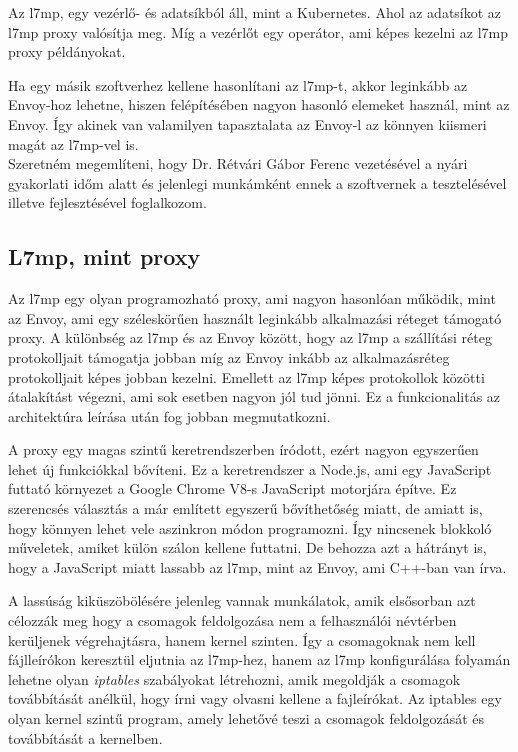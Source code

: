 Az l7mp, egy vezérlő- és adatsíkból áll, mint a Kubernetes. Ahol az adatsíkot 
az l7mp proxy valósítja meg. Míg a vezérlőt egy operátor, ami képes kezelni 
az l7mp proxy példányokat. 

Ha egy másik szoftverhez kellene hasonlítani az l7mp-t, akkor leginkább az 
Envoy-hoz lehetne, hiszen felépítésében nagyon hasonló elemeket használ, mint
az Envoy. Így akinek van valamilyen tapasztalata az Envoy-l az könnyen kiismeri
magát az l7mp-vel is.  \\

Szeretném megemlíteni, hogy Dr. Rétvári Gábor Ferenc vezetésével a nyári
gyakorlati időm alatt és jelenlegi munkámként ennek a szoftvernek a tesztelésével 
illetve fejlesztésével foglalkozom. 

\subsection{L7mp, mint proxy}

Az l7mp egy olyan programozható proxy, ami nagyon hasonlóan működik, mint az Envoy, ami 
egy széleskörűen használt leginkább alkalmazási réteget támogató proxy. A különbség
az l7mp és az Envoy között, hogy az l7mp a szállítási réteg protokolljait 
támogatja jobban míg az Envoy inkább az alkalmazásréteg protokolljait képes jobban kezelni.
Emellett az l7mp képes protokollok közötti átalakítást végezni, ami sok esetben nagyon
jól tud jönni. Ez a funkcionalitás az architektúra leírása után fog jobban 
megmutatkozni.

A proxy egy magas szintű keretrendszerben íródott, ezért nagyon egyszerűen 
lehet új funkciókkal bővíteni. Ez a keretrendszer a Node.js, ami egy JavaScript
futtató környezet a Google Chrome V8-s JavaScript motorjára építve. Ez szerencsés 
választás a már említett egyszerű bővíthetőség miatt, de  amiatt is, hogy
könnyen lehet vele aszinkron módon programozni. Így nincsenek blokkoló műveletek,
amiket külön szálon kellene futtatni. De behozza azt a hátrányt is, hogy a 
JavaScript miatt lassabb az l7mp, mint az Envoy, ami C++-ban van írva. 

A lassúság kiküszöbölésére jelenleg vannak munkálatok, amik elsősorban azt 
célozzák meg hogy a csomagok feldolgozása nem a felhasználói névtérben kerüljenek
végrehajtásra, hanem kernel szinten. Így a csomagoknak nem kell fájlleírókon 
keresztül eljutnia az l7mp-hez, hanem az l7mp konfigurálása folyamán lehetne
olyan \textit{iptables} szabályokat létrehozni, amik megoldják a csomagok továbbítását
anélkül, hogy írni vagy olvasni kellene a fajleírókat. Az iptables egy olyan 
kernel szintű program, amely lehetővé teszi a csomagok feldolgozását és továbbítását
a kernelben. \\

